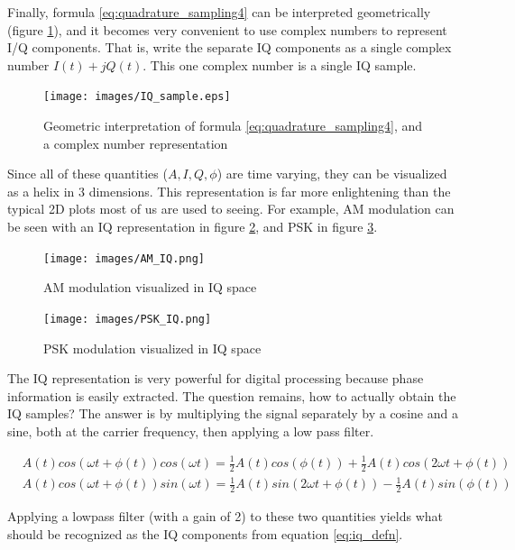 \documentclass[a4paper, 12pt]{article}
\begin{document}
Finally, formula \ref{eq:quadrature_sampling4} can be interpreted geometrically (figure \ref{fig:quadrature_sampling}), and it becomes very convenient to use complex numbers to represent I/Q components.  That is, write the separate IQ components as a single complex number $I(t) + jQ(t)$.  This one complex number is a single IQ sample.

\begin{figure}[h]
\caption{Geometric interpretation of formula \ref{eq:quadrature_sampling4}, and a complex number representation}
\label{fig:quadrature_sampling}
\centering
\texttt{[image: images/IQ\_sample.eps]}
\end{figure}

Since all of these quantities ($A, I, Q, \phi$) are time varying, they can be visualized as a helix in 3 dimensions.  This representation is far more enlightening than the typical 2D plots most of us are used to seeing.  For example, AM modulation can be seen with an IQ representation in figure \ref{fig:am_iq}, and PSK in figure \ref{fig:psk_iq}.

\begin{figure}[ht]
\caption{AM modulation visualized in IQ space}
\label{fig:am_iq}
\centering
\texttt{[image: images/AM\_IQ.png]}
\end{figure}

\begin{figure}[ht]
\caption{PSK modulation visualized in IQ space}
\label{fig:psk_iq}
\centering
\texttt{[image: images/PSK\_IQ.png]}
\end{figure}

The IQ representation is very powerful for digital processing because phase information is easily extracted.  The question remains, how to actually obtain the IQ samples?  The answer is by multiplying the signal separately by a cosine and a sine, both at the carrier frequency, then applying a low pass filter.

\begin{equation*}
\label{eq:quadrature_sampling5}
\begin{aligned}
  &A(t)cos(\omega t + \phi(t))cos(\omega t) = \frac{1}{2}A(t)cos(\phi(t)) + \frac{1}{2}A(t)cos(2\omega t + \phi (t))\\
  &A(t)cos(\omega t + \phi(t))sin(\omega t) = \frac{1}{2}A(t)sin(2\omega t + \phi(t)) - \frac{1}{2}A(t)sin(\phi(t))
\end{aligned}
\end{equation*}

Applying a lowpass filter (with a gain of 2) to these two quantities yields what should be recognized as the IQ components from equation \ref{eq:iq_defn}.
\end{document}
